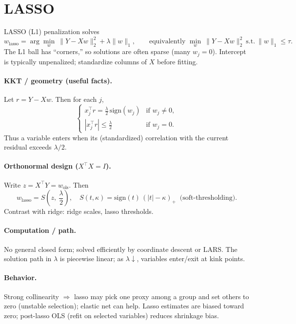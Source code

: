\section{LASSO}

LASSO (L1) penalization solves
\[
w_{\text{lasso}}=\arg\min_{w}\ \|Y-Xw\|_2^2+\lambda\|w\|_1,
\qquad
\text{equivalently } \min_{w}\ \|Y-Xw\|_2^2 \ \text{s.t.}\ \|w\|_1\le \tau.
\]
The L1 ball has ``corners,'' so solutions are often sparse (many $w_j=0$). Intercept is typically unpenalized; standardize columns of $X$ before fitting.

\paragraph{KKT / geometry (useful facts).}
Let $r=Y-Xw$. Then for each $j$,
\[
\begin{cases}
x_j^\top r=\frac{\lambda}{2}\,\mathrm{sign}(w_j) & \text{if } w_j\neq 0,\\[2pt]
|x_j^\top r|\le \frac{\lambda}{2} & \text{if } w_j=0.
\end{cases}
\]
Thus a variable enters when its (standardized) correlation with the current residual exceeds $\lambda/2$.

\paragraph{Orthonormal design ($X^\top X=I$).}
Write $z=X^\top Y=w_{\text{ols}}$. Then
\[
w_{\text{lasso}}=S\!\left(z,\ \frac{\lambda}{2}\right),\quad
S(t,\kappa)=\mathrm{sign}(t)\,(|t|-\kappa)_+ \ \text{ (soft-thresholding)}.
\]
Contrast with ridge: ridge scales, lasso thresholds.

\paragraph{Computation / path.}
No general closed form; solved efficiently by coordinate descent or LARS. The solution path in $\lambda$ is piecewise linear; as $\lambda\downarrow$, variables enter/exit at kink points.

\paragraph{Behavior.}
Strong collinearity $\Rightarrow$ lasso may pick one proxy among a group and set others to zero (unstable selection); elastic net can help. Lasso estimates are biased toward zero; post-lasso OLS (refit on selected variables) reduces shrinkage bias.




